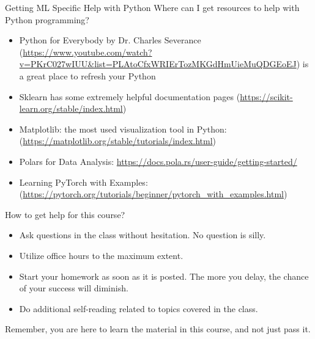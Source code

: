 \documentclass[aspectratio=169,xcolor=dvipsnames,svgnames,x11names,fleqn]{beamer}
\begin{document}
\begin{frame}{Getting ML Specific Help with Python}
Where can I get resources to help with Python programming?
\begin{itemize}
    \item Python for Everybody by Dr. Charles Severance ({\color{MediumRed}\url{https://www.youtube.com/watch?v=PKrC027wIUU&list=PLAtoCfxWRIErTozMKGdHmUieMuQDGEoEJ}}) is a great place to refresh your Python
    \item Sklearn has some extremely helpful documentation pages ({\color{MediumRed}\url{https://scikit-learn.org/stable/index.html}})
    \item Matplotlib: the most used visualization tool in Python: ({\color{MediumRed}\url{https://matplotlib.org/stable/tutorials/index.html}})

	\item Polars for Data Analysis: {\color{MediumRed}\url{https://docs.pola.rs/user-guide/getting-started/}}

    \item Learning PyTorch with Examples: 
    ({\color{MediumRed}\url{https://pytorch.org/tutorials/beginner/pytorch_with_examples.html}})
\end{itemize} 


\end{frame}

\begin{frame}{How to get help for this course?}
\begin{itemize}
    \item Ask questions in the class without hesitation. No question is silly.
    \item Utilize office hours to the maximum extent.
    \item Start your homework as soon as it is posted. The more you delay, the chance of your success will diminish.
    \item Do additional self-reading related to topics covered in the class.
\end{itemize}

\begin{texample}
Remember, you are here to learn the material in this course, and not just pass it.
\end{texample}
\end{frame}
\end{document}
